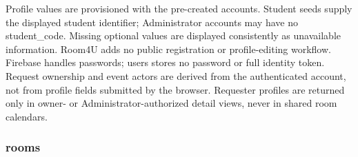 \vspace{2mm}

Profile values are provisioned with the pre-created accounts. Student seeds supply the displayed student identifier; Administrator accounts may have no student\allowbreak\_\allowbreak{}code. Missing optional values are displayed consistently as unavailable information. Room4U adds no public registration or profile-editing workflow. Firebase handles passwords; users stores no password or full identity token. Request ownership and event actors are derived from the authenticated account, not from profile fields submitted by the browser. Requester profiles are returned only in owner- or Administrator-authorized detail views, never in shared room calendars.\par

\subsubsection{rooms}

